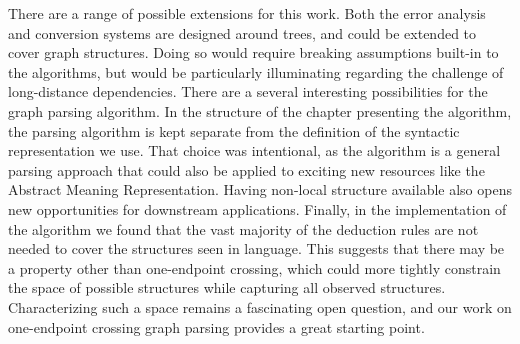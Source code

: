 There are a range of possible extensions for this work.
Both the error analysis and conversion systems are designed around trees, and could be extended to cover graph structures.
Doing so would require breaking assumptions built-in to the algorithms, but would be particularly illuminating regarding the challenge of long-distance dependencies.
There are a several interesting possibilities for the graph parsing algorithm.
In the structure of the chapter presenting the algorithm, the parsing algorithm is kept separate from the definition of the syntactic representation we use.
That choice was intentional, as the algorithm is a general parsing approach that could also be applied to exciting new resources like the Abstract Meaning Representation.
Having non-local structure available also opens new opportunities for downstream applications.
Finally, in the implementation of the algorithm we found that the vast majority of the deduction rules are not needed to cover the structures seen in language.
This suggests that there may be a property other than one-endpoint crossing, which could more tightly constrain the space of possible structures while capturing all observed structures.
Characterizing such a space remains a fascinating open question, and our work on one-endpoint crossing graph parsing provides a great starting point.

